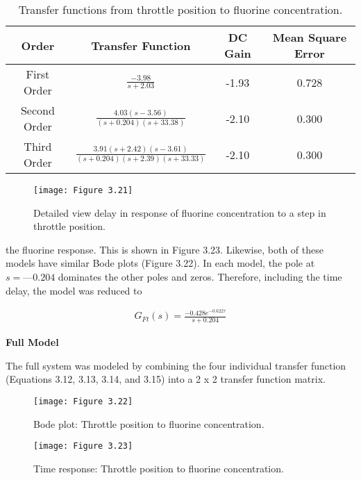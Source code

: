 \begin{table}[H]
	\centering
	\renewcommand{\arraystretch}{2}
	\begin{tabular}{|c|c|c|c|}
		\hline
		Order & Transfer Function & DC Gain & Mean Square Error \\
		\hline 
		First Order & \large{$\frac{-3.98}{s+2.03}$} & -1.93 & 0.728 \\
		\hline
		Second Order & \large{$\frac{4.03(s-3.56)}{(s+0.204)(s+33.38)}$} & -2.10 & 0.300 \\
		\hline
		Third Order & \large{$\frac{3.91(s+2.42)(s-3.61)}{(s+0.204)(s+2.39)(s+33.33)}$} & -2.10 & 0.300 \\
		\hline
	\end{tabular}
	\renewcommand{\arraystretch}{1}
	\bf\caption{ Transfer functions from throttle position to fluorine concentration.}
	\label{Table:3.5}
\end{table}

\begin{figure}[H]
	\centering
	\texttt{[image: Figure 3.21]}
	\bf\caption{  Detailed view delay in response of fluorine concentration to a step in throttle position.}
	\label{fig:3.21}
\end{figure}

\noindent the fluorine response. This is shown in Figure 3.23. Likewise, both of these models have similar Bode plots (Figure 3.22).
In each model, the pole at $s = —0.204$ dominates the other poles and zeros. Therefore, including the time delay, the model was reduced to


\begin{align}
	G_{Ft}(s) = \frac{-0.428e^{-0.622\tau}}{s+0.204}
\end{align}


\noindent\textbf{Full Model}

The full system was modeled by combining the four individual transfer function (Equations 3.12, 3.13, 3.14, and 3.15) into a 2 x 2 transfer function matrix.

\begin{figure}[H]
	\centering
	\texttt{[image: Figure 3.22]}
	\bf\caption{  Bode plot: Throttle position to fluorine concentration.}
	\label{fig:3.22}
\end{figure}

\begin{figure}[H]
	\centering
	\texttt{[image: Figure 3.23]}
	\bf\caption{  Time response: Throttle position to fluorine concentration.}
	\label{fig:3.23}
\end{figure}

